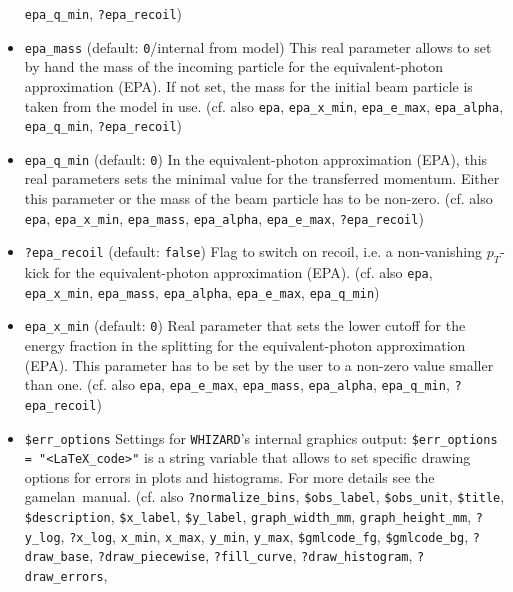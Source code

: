 \documentclass[12pt]{book}
\newcommand{\ttt}[1]{\texttt{#1}}
\newcommand{\whizard}{\texttt{WHIZARD}}
\newcommand{\gamelan}{\textsf{gamelan}}
\begin{document}
\begin{itemize}
\ttt{epa\_q\_min}, \ttt{?epa\_recoil}) 
\item
\ttt{epa\_mass} \qquad (default: \ttt{0}/internal from model) \newline 
This real parameter allows to set by hand the mass of the incoming
particle for the equivalent-photon approximation (EPA). If not
set, the mass for the initial beam particle is taken from the model in
use. (cf. also \ttt{epa}, \ttt{epa\_x\_min}, \ttt{epa\_e\_max},
\ttt{epa\_alpha}, \ttt{epa\_q\_min}, \ttt{?epa\_recoil}) 
\item
\ttt{epa\_q\_min} \qquad (default: \ttt{0})
\newline
In the equivalent-photon approximation (EPA), this real parameters
sets the minimal value for the transferred momentum. Either this
parameter or the mass of the beam particle has to be non-zero.
(cf. also \ttt{epa}, \ttt{epa\_x\_min}, \ttt{epa\_mass},
\ttt{epa\_alpha}, \ttt{epa\_e\_max}, \ttt{?epa\_recoil}) 
\item
\ttt{?epa\_recoil} \qquad (default: \ttt{false}) \newline
Flag to switch on recoil, i.e. a non-vanishing $p_T$-kick for the
equivalent-photon approximation (EPA). 
(cf. also \ttt{epa}, \ttt{epa\_x\_min}, \ttt{epa\_mass},
\ttt{epa\_alpha}, \ttt{epa\_e\_max}, \ttt{epa\_q\_min}) 
\item
\ttt{epa\_x\_min} \qquad (default: \ttt{0}) \newline
Real parameter that sets the lower cutoff for the energy fraction in
the splitting for the equivalent-photon approximation (EPA). This
parameter has to be set by the user to a non-zero value smaller than
one. (cf. also \ttt{epa}, \ttt{epa\_e\_max}, \ttt{epa\_mass},
\ttt{epa\_alpha}, \ttt{epa\_q\_min}, \ttt{?epa\_recoil}) 
\item
\ttt{\$err\_options} \newline
Settings for \whizard's internal graphics output: \ttt{\$err\_options
= "<LaTeX\_code>"} is a string variable that allows to set specific
drawing options for errors in plots and histograms. For more details
see the \gamelan\ manual. (cf. also
\ttt{?normalize\_bins}, \ttt{\$obs\_label}, \ttt{\$obs\_unit}, 
\ttt{\$title}, \ttt{\$description}, \ttt{\$x\_label},
\ttt{\$y\_label}, \ttt{graph\_width\_mm}, \ttt{graph\_height\_mm},
\ttt{?y\_log}, \ttt{?x\_log}, \ttt{x\_min}, \ttt{x\_max}, 
\ttt{y\_min}, \ttt{y\_max}, \ttt{\$gmlcode\_fg}, \ttt{\$gmlcode\_bg},
\ttt{?draw\_base}, \ttt{?draw\_piecewise},
\ttt{?fill\_curve}, \ttt{?draw\_histogram}, \ttt{?draw\_errors},

\end{itemize}
\end{document}
